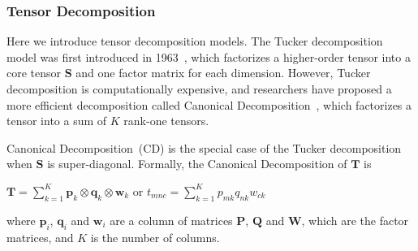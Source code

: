 \subsubsection{Tensor Decomposition}
Here we introduce tensor decomposition models.
The Tucker decomposition model was first introduced in 1963~\cite{tucker1963implications}, which factorizes a higher-order tensor into a core tensor $\mathbf{S}$ and one factor matrix for each dimension.
However, Tucker decomposition is computationally expensive, and researchers have proposed a more efficient decomposition called Canonical Decomposition~\cite{carroll1970analysis}, which factorizes a tensor into a sum of $K$ rank-one tensors.

Canonical Decomposition~(CD) is the special case of the Tucker decomposition when $\mathbf{S}$ is super-diagonal.
Formally, the Canonical Decomposition of $\mathbf{T}$ is
\begin{center}
$\mathbf{T}=\sum\limits_{k=1}^{K}\mathbf{p}_k\otimes \mathbf{q}_k\otimes \mathbf{w}_k$
or
$t_{mnc}=\sum\limits_{k=1}^{K}p_{mk} q_{nk} w_{ck}$
\end{center}
where $\mathbf{p}_i$, $\mathbf{q}_i$ and $\mathbf{w}_i$ are a column of matrices $\mathbf{P}$, $\mathbf{Q}$ and $\mathbf{W}$, which are the factor matrices, and $K$ is the number of columns. 


